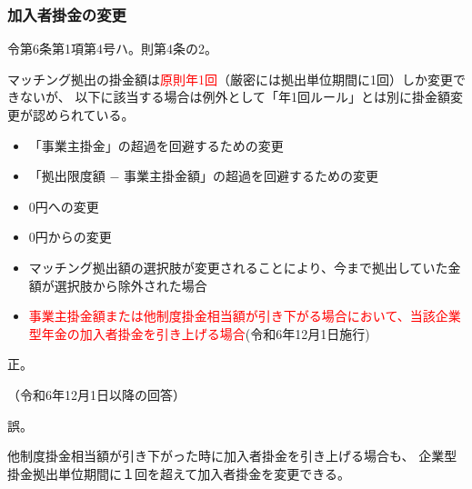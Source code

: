 \newpage

\subsubsection{加入者掛金の変更}

\begin{itembox}[l]{}
  令第6条第1項第4号ハ。則第4条の2。

  マッチング拠出の掛金額は\textcolor{red}{原則年1回}（厳密には拠出単位期間に1回）しか変更できないが、
  以下に該当する場合は例外として「年1回ルール」とは別に掛金額変更が認められている。
  \begin{itemize}
    \item 「事業主掛金」の超過を回避するための変更
    \item 「拠出限度額 $-$ 事業主掛金額」の超過を回避するための変更
    \item 0円への変更
    \item 0円からの変更
    \item マッチング拠出額の選択肢が変更されることにより、今まで拠出していた金額が選択肢から除外された場合
    \item \textcolor{red}{事業主掛金額または他制度掛金相当額が引き下がる場合において、当該企業型年金の加入者掛金を引き上げる場合}(令和6年12月1日施行)
  \end{itemize}

\end{itembox}

\begin{sol}
  \;

  正。

  \begin{shadebox}
    （令和6年12月1日以降の回答）
    
    誤。

    他制度掛金相当額が引き下がった時に加入者掛金を引き上げる場合も、
    企業型掛金拠出単位期間に１回を超えて加入者掛金を変更できる。
  \end{shadebox}
  
\end{sol}

\newpage
